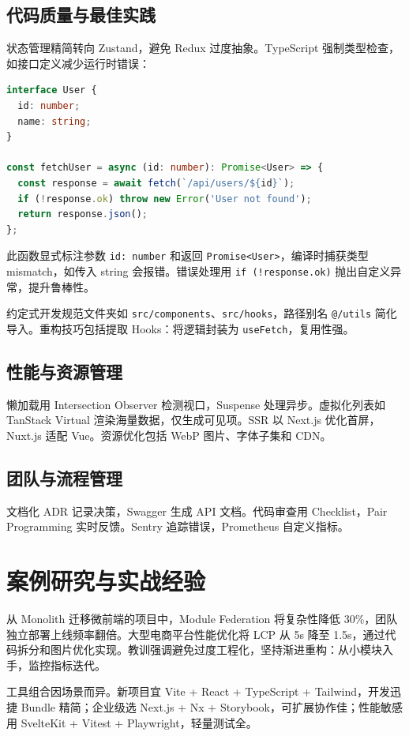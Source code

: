 \section{代码质量与最佳实践}
状态管理精简转向 Zustand，避免 Redux 过度抽象。TypeScript 强制类型检查，如接口定义减少运行时错误：\par
\begin{lstlisting}[language=typescript]
interface User {
  id: number;
  name: string;
}

const fetchUser = async (id: number): Promise<User> => {
  const response = await fetch(`/api/users/${id}`);
  if (!response.ok) throw new Error('User not found');
  return response.json();
};
\end{lstlisting}
此函数显式标注参数 \texttt{id: number} 和返回 \texttt{Promise<User>}，编译时捕获类型 mismatch，如传入 string 会报错。错误处理用 \texttt{if (!response.ok)} 抛出自定义异常，提升鲁棒性。\par
约定式开发规范文件夹如 \texttt{src/components}、\texttt{src/hooks}，路径别名 \texttt{@/utils} 简化导入。重构技巧包括提取 Hooks：将逻辑封装为 \texttt{useFetch}，复用性强。\par
\section{性能与资源管理}
懒加载用 Intersection Observer 检测视口，Suspense 处理异步。虚拟化列表如 TanStack Virtual 渲染海量数据，仅生成可见项。SSR 以 Next.js 优化首屏，Nuxt.js 适配 Vue。资源优化包括 WebP 图片、字体子集和 CDN。\par
\section{团队与流程管理}
文档化 ADR 记录决策，Swagger 生成 API 文档。代码审查用 Checklist，Pair Programming 实时反馈。Sentry 追踪错误，Prometheus 自定义指标。\par
\chapter{案例研究与实战经验}
从 Monolith 迁移微前端的项目中，Module Federation 将复杂性降低 30\%{}，团队独立部署上线频率翻倍。大型电商平台性能优化将 LCP 从 5s 降至 1.5s，通过代码拆分和图片优化实现。教训强调避免过度工程化，坚持渐进重构：从小模块入手，监控指标迭代。\par
工具组合因场景而异。新项目宜 Vite + React + TypeScript + Tailwind，开发迅捷 Bundle 精简；企业级选 Next.js + Nx + Storybook，可扩展协作佳；性能敏感用 SvelteKit + Vitest + Playwright，轻量测试全。\par
